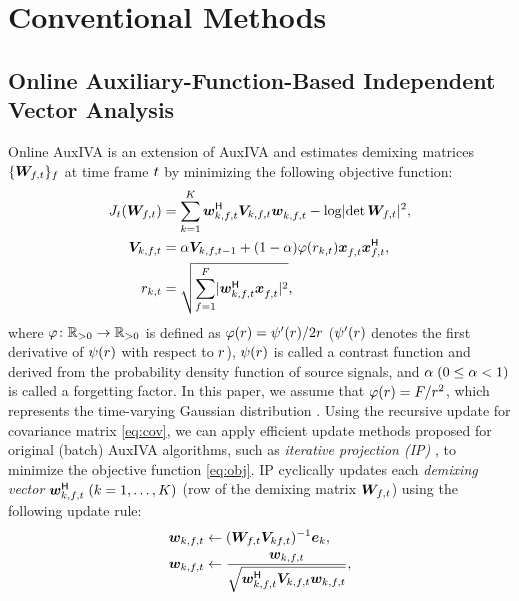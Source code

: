 \documentclass[sip,biber]{now-journal}
\begin{document}
\section{Conventional Methods}\label{sec:conventional}

\subsection{Online Auxiliary-Function-Based Independent Vector Analysis}\label{subsec:oiva}

Online AuxIVA \cite{Taniguchi:2014:HSCMA} is an extension of AuxIVA \cite{Ono:2011:WASPAA} and estimates demixing matrices $\{\Demix _{\ft}\} _{\freq}$ at time frame $t$ by minimizing the following objective function:
\begin{align}
  J _{\tframe}(\Demix _{\ft}) &= \sum _{\src = 1} ^{\Src} \demix _{\src,\ft} ^{\hermite} \cov _{\src,\ft} \demix _{\src,\ft} ^{\nohermite} - \logdet{\Demix _{\ft}} ^2, \label{eq:obj} \\
  \cov _{\src,\ft} &= \forget \cov _{\src,\ft[-1]} + (1 - \forget) \weight(\var _{\src,\tframe}) \Obs _{\ft} ^{\nohermite} \Obs _{\ft} ^{\hermite}, \label{eq:cov} \\
  \var _{\src,\tframe} &= \sqrt{\sum _{\freq=1} ^{\Freq} \lvert \demix ^{\hermite} _{\src,\ft} \Obs ^{\nohermite}_{\ft} \rvert ^2},
\end{align}
where $\varphi\colon \mathbb{R} _{>0} \to \mathbb{R} _{>0}$ is defined as $\varphi(r) = \psi ' (r) / 2 r$ ($\psi '(r)$ denotes the first derivative of $\psi (r)$ with respect to $r$),
$\psi(r)$ is called a contrast function and derived from the probability density function of source signals,
and $\alpha\; (0 \leq \alpha < 1)$ is called a forgetting factor.
In this paper, we assume that $\varphi (r) = F/{r ^2}$, which represents the time-varying Gaussian distribution \cite{Ono:2012:APSIPA}.
Using the recursive update for covariance matrix \eqref{eq:cov}, we can apply efficient update methods proposed for original (batch) AuxIVA algorithms, such as \emph{iterative projection (IP)} \cite{Ono:2011:WASPAA}, to minimize the objective function \eqref{eq:obj}.
IP cyclically updates each \emph{demixing vector} $\demix _{\src,\ft} ^{\hermite}\; (\src = 1, \dots, \Src)$ (row of the demixing matrix $\Demix _{\ft}$) using the following update rule:
\begin{align}
  \demix _{\src,\ft} &\gets (\Demix _{\ft} \cov _{\src\ft}) ^{-1} \eye _{\src} \label{eq:ip:proj}, \\
  \demix _{\src,\ft} &\gets \frac{{\demix _{\src,\ft}}}{{\sqrt{\demix _{\src,\ft} ^{\hermite} \cov _{\src,\ft} \demix _{\src,\ft}}}} \label{eq:ip:norm},
\end{align}
\end{document}

